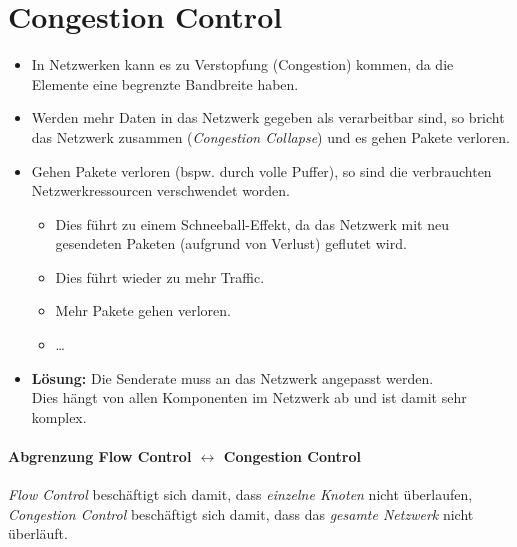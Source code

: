     \section{Congestion Control}
        \begin{itemize}
        	\item In Netzwerken kann es zu Verstopfung (Congestion) kommen, da die Elemente eine begrenzte Bandbreite haben.
        	\item Werden mehr Daten in das Netzwerk gegeben als verarbeitbar sind, so bricht das Netzwerk zusammen (\textit{Congestion Collapse}) und es gehen Pakete verloren.
        	\item Gehen Pakete verloren (bspw. durch volle Puffer), so sind die verbrauchten Netzwerkressourcen verschwendet worden.
            	\begin{itemize}
            		\item Dies führt zu einem Schneeball-Effekt, da das Netzwerk mit neu gesendeten Paketen (aufgrund von Verlust) geflutet wird.
            		\item Dies führt wieder zu mehr Traffic.
            		\item Mehr Pakete gehen verloren.
            		\item \dots
            	\end{itemize}
            \item \textbf{Lösung:} Die Senderate muss an das Netzwerk angepasst werden. \\ Dies hängt von allen Komponenten im Netzwerk ab und ist damit sehr komplex.
        \end{itemize}
        
        \paragraph{Abgrenzung Flow Control \( \leftrightarrow \) Congestion Control}
            \textit{Flow Control} beschäftigt sich damit, dass \textit{einzelne Knoten} nicht überlaufen, \\
            \indent \textit{Congestion Control} beschäftigt sich damit, dass das \textit{gesamte Netzwerk} nicht überläuft.


